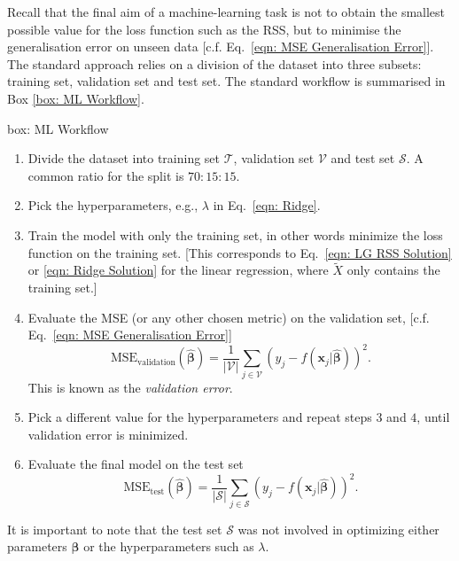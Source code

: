 Recall that the final aim of a machine-learning task is not to obtain the smallest possible value for the loss function such as the RSS, but to minimise the generalisation error on unseen data [c.f. Eq.~\eqref{eqn: MSE Generalisation Error}]. The standard approach relies on a division of the dataset into three subsets: training set, validation set and test set. %
The standard workflow is summarised in Box \ref{box: ML Workflow}.
\begin{mybox}[ML Workflow]{box: ML Workflow}
\begin{enumerate}
    \item Divide the dataset into training set $\mathcal{T}$, validation set $\mathcal{V}$ and test set $\mathcal{S}$. A common ratio for the split is $70 : 15 : 15$.
    \item Pick the hyperparameters, e.g., $\lambda$ in Eq.~\eqref{eqn: Ridge}.
    \item Train the model with only the training set, in other words minimize the loss function on the training set. [This corresponds to Eq.~\eqref{eqn: LG RSS Solution} or \eqref{eqn: Ridge Solution} for the linear regression, where $\widetilde{X}$ only contains the training set.]
    \item Evaluate the MSE (or any other chosen metric) on the validation set, [c.f. Eq.~\eqref{eqn: MSE Generalisation Error}]
    \begin{equation}
        \textrm{MSE}_{\textrm{validation}}(\hat{\bm{\beta}}) = \frac{1}{|\mathcal{V}|}\sum_{j\in\mathcal{V}} (y_j - f(\bm{x}_j|\hat{\bm{\beta}}))^2.
    \end{equation}
This is known as the \emph{validation error}.
    \item Pick a different value for the hyperparameters and repeat steps $3$ and $4$, until validation error is minimized.
    \item Evaluate the final model on the test set
    \begin{equation}
        \textrm{MSE}_{\textrm{test}}(\hat{\bm{\beta}}) = \frac{1}{|\mathcal{S}|}\sum_{j\in\mathcal{S}} (y_j - f(\bm{x}_j|\hat{\bm{\beta}}))^2.
    \end{equation}
\end{enumerate}
\end{mybox}

It is important to note that the test set $\mathcal{S}$ was not involved in optimizing either parameters $\bm{\beta}$ or the hyperparameters such as $\lambda$.


